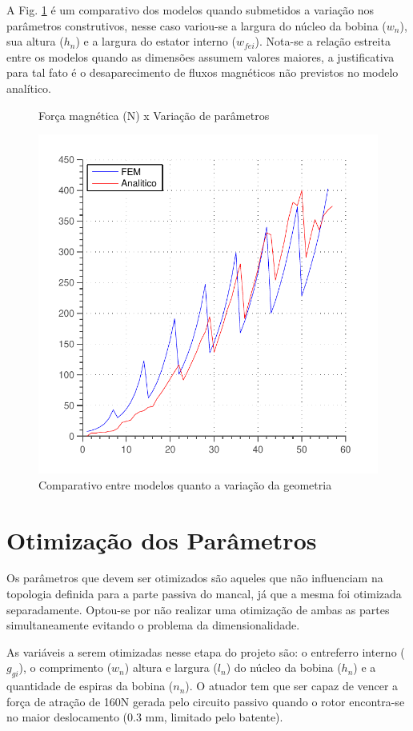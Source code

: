 A Fig. \ref{fig:validacao_ativo_2d} é um comparativo dos modelos quando submetidos a variação nos parâmetros construtivos, nesse caso variou-se a largura do núcleo da bobina ($w_n$), sua altura ($h_n$) e a largura do estator interno ($w_{fei}$). Nota-se a relação estreita entre os modelos quando as dimensões assumem valores maiores, a justificativa para tal fato é o desaparecimento de fluxos magnéticos não previstos no modelo analítico.

\begin{figure}[th]
	\centering
	\caption{Força magnética (N) x Variação de parâmetros}
	\includegraphics[width=0.7\linewidth]{Figs/Simulacoes/Ativo/validacao_ativo_2d}
	\caption{Comparativo entre modelos quanto a variação da geometria}
	\label{fig:validacao_ativo_2d}
\end{figure}

\section{Otimização dos Parâmetros}

Os parâmetros que devem ser otimizados são aqueles que não influenciam na topologia definida para a parte passiva do mancal, já que a mesma foi otimizada separadamente. Optou-se por não realizar uma otimização de ambas as partes simultaneamente evitando o problema da dimensionalidade.

As variáveis a serem otimizadas nesse etapa do projeto são: o entreferro interno ($g_{gi}$), o comprimento ($w_n$) altura  e largura ($l_n$) do núcleo da bobina ($h_n$) e a quantidade de espiras da bobina ($n_n$). O atuador tem que ser capaz de vencer a força de atração de 160N gerada pelo circuito passivo quando o rotor encontra-se no maior deslocamento (0.3 mm, limitado pelo batente). 

